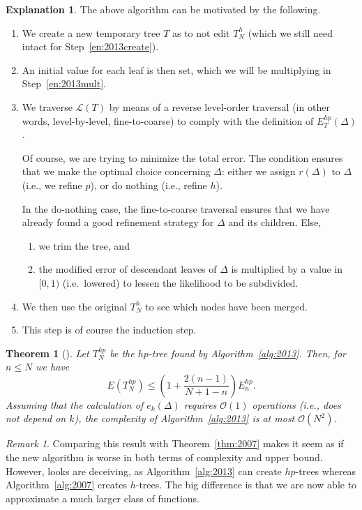 \documentclass[11pt]{report}
\newtheorem{theorem}{Theorem}
\theoremstyle{definition}
\newtheorem*{explanation}{Explanation}
\theoremstyle{remark}
\newtheorem*{remark}{Remark}
\renewcommand{\L}{\mathcal{L}}
\renewcommand{\O}{\mathcal{O}}
\newcommand{\hp}{{hp}}
\newcommand{\node}{\Delta}
\begin{document}
\begin{explanation} The above algorithm can be motivated by the following. 
\begin{enumerate}
  \item We create a new temporary tree $T$ as to not edit $T^h_N$ (which we still need intact for Step~\ref{en:2013create}). 
  \item An initial value for each leaf is then set, which we will be multiplying in Step~\ref{en:2013mult}.
  \item We traverse $\L(T)$ by means of a reverse level-order traversal (in other words, level-by-level, fine-to-coarse) to comply with the definition of $E^\hp_T(\node)$. 
    
    Of course, we are trying to minimize the total error. The condition ensures that we make the optimal choice concerning $\node$: either we assign $r(\node)$ to $\node$ (i.e., we refine $p$), or do nothing (i.e., refine $h$). 
    
    In the do-nothing case, the fine-to-coarse traversal ensures that we have already found a good refinement strategy for $\node$ and its children. Else,
    \begin{enumerate}
      \item we trim the tree, and 
      \item the modified error of descendant leaves of $\node$ is multiplied by a value in $[0,1)$ (i.e.~lowered) to lessen the likelihood to be subdivided.
    \end{enumerate}
  \item We then use the original $T_N^h$ to see which nodes have been merged. 
  \item This step is of course the induction step.
\end{enumerate}
\end{explanation}

\begin{theorem}[{\cite{2013}}]
  Let $T^\hp_N$ be the $hp$-tree found by Algorithm~\ref{alg:2013}. Then, for $n \leq N$ we have
  \[
    E(T^\hp_N) \leq \left( 1 + \frac{ 2(n-1)}{ N + 1 - n} \right) E^\hp_n.
  \]
  Assuming that the calculation of $e_k(\node)$ requires $\O(1)$ operations (i.e., does not depend on $k$), the complexity of Algorithm~\ref{alg:2013} is at most $\O(N^2)$.
\end{theorem}
\begin{remark}
  Comparing this result with Theorem~\ref{thm:2007} makes it seem as if the new algorithm is worse in both terms of complexity and upper bound. However, looks are deceiving, as Algorithm~\ref{alg:2013} can create $hp$-trees whereas Algorithm~\ref{alg:2007} creates $h$-trees. The big difference is that we are now able to approximate a much larger class of functions.
\end{remark}
\end{document}
